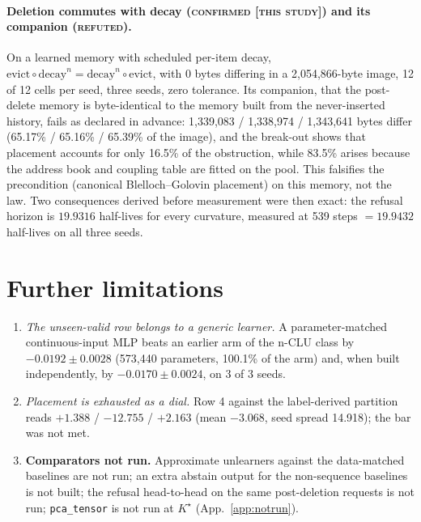\documentclass{article} %
\newcommand{\Kstar}{\ensuremath{K^{\star}}}
\begin{document}
\paragraph{Deletion commutes with decay (\textsc{confirmed [this study]}) and its companion
(\textsc{refuted}).} On a learned memory with scheduled per-item decay,
$\text{evict}\circ\text{decay}^n=\text{decay}^n\circ\text{evict}$, with 0 bytes differing in a
2,054,866-byte image, 12 of 12 cells per seed, three seeds, zero tolerance.
Its companion, that the post-delete memory is byte-identical to the memory built from the
never-inserted history, fails as declared in advance: 1,339,083 / 1,338,974 / 1,343,641 bytes differ
(65.17\% / 65.16\% / 65.39\% of the image), and the break-out shows that placement accounts for
only 16.5\% of the obstruction, while 83.5\% arises because the address book and coupling table
are fitted on the pool. %
This falsifies the precondition (canonical Blelloch--Golovin placement) on this memory, not the
law. Two consequences derived before measurement were then exact: the refusal horizon is $19.9316$
half-lives for every curvature, measured at 539 steps $=19.9432$ half-lives on all three seeds.


\section{Further limitations}
\label{app:morelimits}
\begin{enumerate}
\item \emph{The unseen-valid row belongs to a generic learner.} A parameter-matched
  continuous-input MLP beats an earlier arm of the n-CLU class by $-0.0192\pm0.0028$ (573,440
  parameters, 100.1\% of the arm) and, when built independently, by $-0.0170\pm0.0024$, on 3 of 3
  seeds. %
\item \emph{Placement is exhausted as a dial.} Row 4 against the label-derived partition reads
  $+1.388$ / $-12.755$ / $+2.163$ (mean $-3.068$, seed spread 14.918); the bar was not met.
\item \textbf{Comparators not run.} Approximate unlearners against the data-matched baselines are not
  run; an extra abstain output for the non-sequence baselines is not built; the refusal head-to-head on
  the same post-deletion requests is not run; \texttt{pca\_tensor} is not run at $\Kstar$
  (App.~\ref{app:notrun}).
\end{enumerate}
\end{document}
